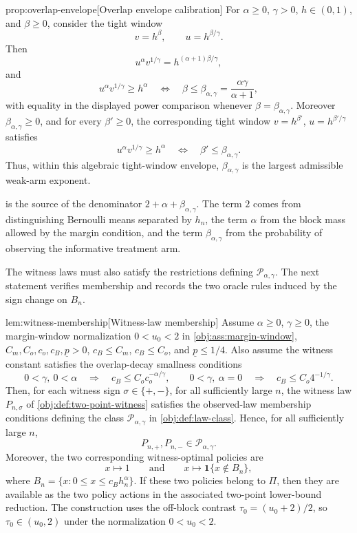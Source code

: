 \begin{propositionv}{prop:overlap-envelope}[Overlap envelope calibration]
For \(\alpha\ge0\), \(\gamma>0\), \(h\in(0,1)\), and \(\beta\ge0\), consider the tight window
\[
v=h^\beta,
\qquad
u=h^{\beta/\gamma}.
\]
Then
\[
u^\alpha v^{1/\gamma}
=
h^{(\alpha+1)\beta/\gamma},
\]
and
\[
u^\alpha v^{1/\gamma}\ge h^\alpha
\quad\Longleftrightarrow\quad
\beta\le \beta_{\alpha,\gamma}=\frac{\alpha\gamma}{\alpha+1},
\]
with equality in the displayed power comparison whenever \(\beta=\beta_{\alpha,\gamma}\). Moreover \(\beta_{\alpha,\gamma}\ge0\), and for every \(\beta'\ge0\), the corresponding tight window \(v=h^{\beta'}\), \(u=h^{\beta'/\gamma}\) satisfies
\[
u^\alpha v^{1/\gamma}\ge h^\alpha
\quad\Longleftrightarrow\quad
\beta'\le\beta_{\alpha,\gamma}.
\]
Thus, within this algebraic tight-window envelope, \(\beta_{\alpha,\gamma}\) is the largest admissible weak-arm exponent.
\end{propositionv}

 is the source of the denominator \(2+\alpha+\beta_{\alpha,\gamma}\).  The term \(2\) comes from distinguishing Bernoulli means separated by \(h_n\), the term \(\alpha\) from the block mass allowed by the margin condition, and the term \(\beta_{\alpha,\gamma}\) from the probability of observing the informative treatment arm.

The witness laws must also satisfy the restrictions defining \(\mathcal P_{\alpha,\gamma}\).  The next statement verifies membership and records the two oracle rules induced by the sign change on \(B_n\).

\begin{lemmav}{lem:witness-membership}[Witness-law membership]
Assume \(\alpha\ge0\), \(\gamma\ge0\), the margin-window normalization \(0<u_0<2\) in \cref{obj:ass:margin-window}, \(C_m,C_o,c_o,c_B,\underline p>0\), \(c_B\le C_m\), \(c_B\le C_o\), and \(\underline p\le 1/4\). Also assume the witness constant satisfies the overlap-decay smallness conditions
\[
0<\gamma,\ 0<\alpha
\quad\Longrightarrow\quad
c_B\le C_o c_o^{-\alpha/\gamma},
\qquad
0<\gamma,\ \alpha=0
\quad\Longrightarrow\quad
c_B\le C_o 4^{-1/\gamma}.
\]
Then, for each witness sign \(\sigma\in\{+,-\}\), for all sufficiently large \(n\), the witness law \(P_{n,\sigma}\) of \cref{obj:def:two-point-witness} satisfies the observed-law membership conditions defining the class \(\mathcal P_{\alpha,\gamma}\) in \cref{obj:def:law-class}. Hence, for all sufficiently large \(n\),
\[
P_{n,+},P_{n,-}\in \mathcal P_{\alpha,\gamma}.
\]
Moreover, the two corresponding witness-optimal policies are
\[
x\mapsto 1
\qquad\text{and}\qquad
x\mapsto \mathbf 1\{x\notin B_n\},
\]
where \(B_n=\{x:0\le x\le c_B h_n^\alpha\}\). If these two policies belong to \(\Pi\), then they are available as the two policy actions in the associated two-point lower-bound reduction. The construction uses the off-block contrast \(\tau_0=(u_0+2)/2\), so \(\tau_0\in(u_0,2)\) under the normalization \(0<u_0<2\).
\end{lemmav}

